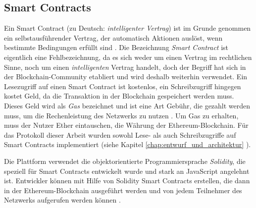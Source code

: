 \subsection{Smart Contracts}
\label{subsection:smart_contracts}


Ein Smart Contract (zu Deutsch: \textit{intelligenter Vertrag}) ist im Grunde genommen ein selbstausführender Vertrag, der automatisch Aktionen auslöst, wenn bestimmte Bedingungen erfüllt sind \Parencite[S. 1-2]{Perez_SmartContractVulnerabilities}. Die Bezeichnung \textit{Smart Contract} ist eigentlich eine Fehlbezeichnung, da es sich weder um einen Vertrag im rechtlichen Sinne, noch um einen \textit{intelligenten} Vertrag handelt, doch der Begriff hat sich in der Blockchain-Community etabliert und wird deshalb weiterhin verwendet. Ein Lesezugriff auf einen Smart Contract ist kostenlos, ein Schreibzugriff hingegen kostet Geld, da die Transaktion in der Blockchain gespeichert werden muss. Dieses Geld wird als \textit{Gas} bezeichnet und ist eine Art Gebühr, die gezahlt werden muss, um die Rechenleistung des Netzwerks zu nutzen \Parencite[S. 127]{Antonopoulos_MasteringEthereum}. Um Gas zu erhalten, muss der Nutzer Ether eintauschen, die Währung der Ethereum-Blockchain.
Für das Protokoll dieser Arbeit wurden sowohl Lese- als auch Schreibzugriffe auf Smart Contracts implementiert (siehe Kapitel \ref{chap:entwurf_und_architektur} \textit{}).

Die Plattform verwendet die objektorientierte Programmiersprache \textit{Solidity}, die speziell für Smart Contracts entwickelt wurde und stark an JavaScript angelehnt ist. Entwickler können mit Hilfe von Solidity Smart Contracts erstellen, die dann in der Ethereum-Blockchain ausgeführt werden und von jedem Teilnehmer des Netzwerks aufgerufen werden können \Parencite[S. 127-133]{Antonopoulos_MasteringEthereum}.
